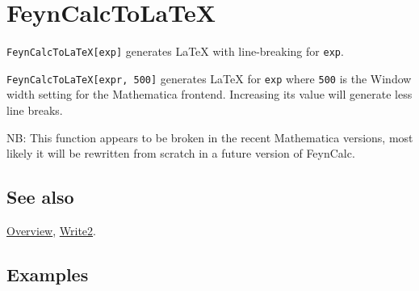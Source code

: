 \documentclass[../FeynCalcManual.tex]{subfiles}
\begin{document}
\hypertarget{feyncalctolatex}{%
\section{FeynCalcToLaTeX}\label{feyncalctolatex}}

\texttt{FeynCalcToLaTeX[\allowbreak{}exp]} generates LaTeX with
line-breaking for \texttt{exp}.

\texttt{FeynCalcToLaTeX[\allowbreak{}expr,\ \allowbreak{}500]} generates
LaTeX for \texttt{exp} where \texttt{500} is the Window width setting
for the Mathematica frontend. Increasing its value will generate less
line breaks.

NB: This function appears to be broken in the recent Mathematica
versions, most likely it will be rewritten from scratch in a future
version of FeynCalc.

\subsection{See also}

\hyperlink{toc}{Overview}, \hyperlink{write2}{Write2}.

\subsection{Examples}
\end{document}
